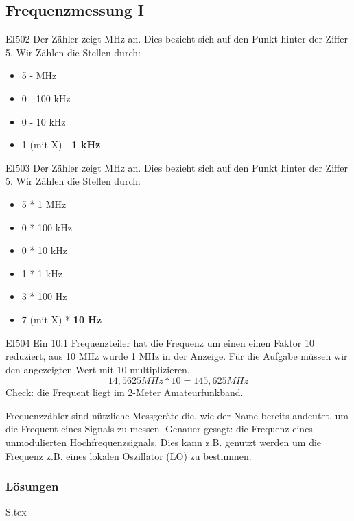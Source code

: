 \documentclass[10pt,a4paper,ngerman]{article}
\theoremstyle{definition}
\theoremstyle{plain}
\theoremstyle{mytheorem}
\theoremstyle{definition}
\newenvironment{ohmchapter}{}
{
  \subsubsection*{Lösungen}
  S\arabic{subsection}.tex}
}
\begin{document}
\subsection{Frequenzmessung I}


\begin{sol}{EI502}
Der Zähler zeigt MHz an. Dies bezieht sich auf den Punkt hinter der Ziffer 5.
Wir Zählen die Stellen durch:
\begin{itemize}
  \item 5 - MHz
  \item 0 - 100 kHz
  \item 0 - 10 kHz
  \item 1 (mit X) - \textbf{1 kHz}
\end{itemize}
\end{sol} 

\begin{sol}{EI503}
Der Zähler zeigt MHz an. Dies bezieht sich auf den Punkt hinter der Ziffer 5.
Wir Zählen die Stellen durch:
\begin{itemize}
  \item 5 * 1 MHz
  \item 0 * 100 kHz
  \item 0 * 10 kHz
  \item 1 * 1 kHz
  \item 3 * 100 Hz
  \item 7 (mit X) * \textbf{10 Hz}
\end{itemize}
\end{sol} 

\begin{sol}{EI504}
 Ein 10:1 Frequenzteiler hat die Frequenz um einen einen Faktor 10 reduziert, aus 10 MHz wurde 1 MHz in der Anzeige.
 Für die Aufgabe müssen wir den angezeigten Wert mit 10 multiplizieren.
 $$ 14,5625 MHz * 10 = 145,625 MHz $$
 Check: die Frequent liegt im 2-Meter Amateurfunkband.
\end{sol}  


\begin{ohmchapter}
Frequenzzähler sind nützliche Messgeräte die, wie der Name bereits andeutet, um die Frequent eines Signals zu messen. Genauer gesagt: die Frequenz eines unmodulierten Hochfrequenzsignals.  Dies kann z.B. genutzt werden um die Frequenz z.B. eines lokalen Oszillator (LO) zu bestimmen.  
\end{ohmchapter}  
\end{document}
